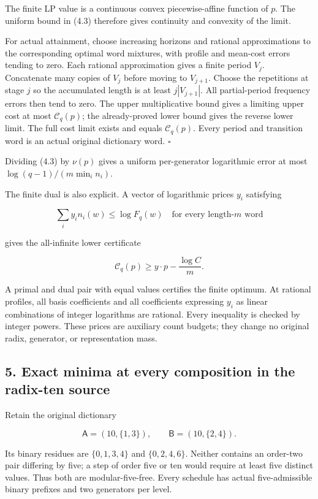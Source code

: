 The finite LP value is a continuous convex piecewise-affine function of \(p\). The uniform bound in (4.3) therefore gives continuity and convexity of the limit.

For actual attainment, choose increasing horizons and rational approximations to the corresponding optimal word mixtures, with profile and mean-cost errors tending to zero. Each rational approximation gives a finite period \(V_j\). Concatenate many copies of \(V_j\) before moving to \(V_{j+1}\). Choose the repetitions at stage \(j\) so the accumulated length is at least \(j|V_{j+1}|\). All partial-period frequency errors then tend to zero. The upper multiplicative bound gives a limiting upper cost at most \(\mathcal C_q(p)\); the already-proved lower bound gives the reverse lower limit. The full cost limit exists and equals \(\mathcal C_q(p)\). Every period and transition word is an actual original dictionary word. \(\square\)

Dividing (4.3) by \(\nu(p)\) gives a uniform per-generator logarithmic error at most \(\log(q-1)/(m\min_i n_i)\).

The finite dual is also explicit. A vector of logarithmic prices \(y_i\) satisfying

\[
\sum_i y_i n_i(w)\le\log F_q(w)
\quad\text{for every length-}m\text{ word}
\tag{4.4}
\]

gives the all-infinite lower certificate

\[
\mathcal C_q(p)\ge y\cdot p-\frac{\log C}{m}.
\tag{4.5}
\]

A primal and dual pair with equal values certifies the finite optimum. At rational profiles, all basis coefficients and all coefficients expressing \(y_i\) as linear combinations of integer logarithms are rational. Every inequality is checked by integer powers. These prices are auxiliary count budgets; they change no original radix, generator, or representation mass.

\subsection{5. Exact minima at every composition in the radix-ten source}\label{exact-minima-at-every-composition-in-the-radix-ten-source}

Retain the original dictionary

\[
\mathsf A=(10,\{1,3\}),\qquad
\mathsf B=(10,\{2,4\}).
\tag{5.1}
\]

Its binary residues are \(\{0,1,3,4\}\) and \(\{0,2,4,6\}\). Neither contains an order-two pair differing by five; a step of order five or ten would require at least five distinct values. Thus both are modular-five-free. Every schedule has actual five-admissible binary prefixes and two generators per level.

